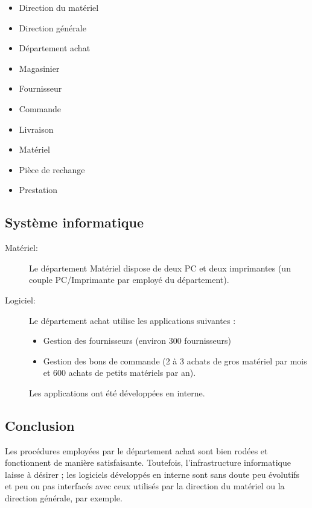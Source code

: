 \begin{itemize}
\item Direction du matériel
\item Direction générale
\item Département achat
\item Magasinier
\item Fournisseur
\item Commande
\item Livraison
\item Matériel
\item Pièce de rechange
\item Prestation
\end{itemize}


\subsection{Système informatique}

\begin{description}
    \item [Matériel:]\el
Le département Matériel dispose de deux PC et deux imprimantes (un couple
PC/Imprimante par employé du département).

    \item [Logiciel:]\el
Le département achat utilise les applications suivantes :
    \begin{itemize}
\item Gestion des fournisseurs (environ 300 fournisseurs)
\item Gestion des bons de commande (2 à 3 achats de gros matériel par mois
        et 600 achats de petits matériels par an).
    \end{itemize}

Les applications ont été développées en interne.

\end{description}

\subsection{Conclusion}

Les procédures employées par le département achat sont bien rodées et
fonctionnent de manière satisfaisante. Toutefois, l'infrastructure
informatique laisse à désirer ; les logiciels développés en interne sont
sans doute peu évolutifs et peu ou pas interfacés avec ceux utilisés par la
direction du matériel ou la direction générale, par exemple.

\vfill
\pagebreak
